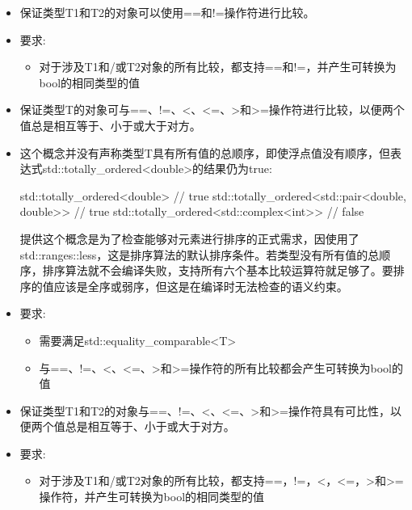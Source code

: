 
\begin{itemize}
\item
保证类型T1和T2的对象可以使用==和!=操作符进行比较。

\item
要求:
\begin{itemize}
\item
对于涉及T1和/或T2对象的所有比较，都支持==和!=，并产生可转换为bool的相同类型的值
\end{itemize}
\end{itemize}


\begin{itemize}
\item
保证类型T的对象可与==、!=、<、<=、>和>=操作符进行比较，以便两个值总是相互等于、小于或大于对方。

\item
这个概念并没有声称类型T具有所有值的总顺序，即使浮点值没有顺序，但表达式std::totally\_ordered<double>的结果仍为true:

\begin{cpp}
std::totally_ordered<double> // true
std::totally_ordered<std::pair<double, double>> // true
std::totally_ordered<std::complex<int>> // false
\end{cpp}

提供这个概念是为了检查能够对元素进行排序的正式需求，因使用了std::ranges::less，这是排序算法的默认排序条件。若类型没有所有值的总顺序，排序算法就不会编译失败，支持所有六个基本比较运算符就足够了。要排序的值应该是全序或弱序，但这是在编译时无法检查的语义约束。

\item
要求:
\begin{itemize}
\item
需要满足std::equality\_comparable<T>

\item
与==、!=、<、<=、>和>=操作符的所有比较都会产生可转换为bool的值
\end{itemize}
\end{itemize}


\begin{itemize}
\item
保证类型T1和T2的对象与==、!=、<、<=、>和>=操作符具有可比性，以便两个值总是相互等于、小于或大于对方。

\item
要求:
\begin{itemize}
\item
对于涉及T1和/或T2对象的所有比较，都支持==，!=，<，<=，>和>=操作符，并产生可转换为bool的相同类型的值
\end{itemize}
\end{itemize}


